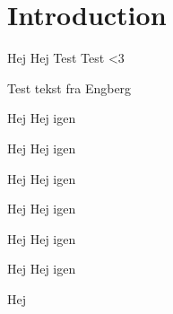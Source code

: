 \chapter{Introduction}
Hej Hej Test Test <3

Test tekst fra Engberg


\begin{defn}{Hej}
Hej igen
\end{defn}

\begin{thmx}{Hej}
Hej igen
\end{thmx}


\begin{lem}{Hej}
Hej igen
\end{lem}

\begin{prop}{Hej}
Hej igen
\end{prop}

\begin{kor}{Hej}
Hej igen
\end{kor}

\begin{exmp}{Hej}
Hej igen
\end{exmp}

\begin{bev}
Hej
\end{bev}